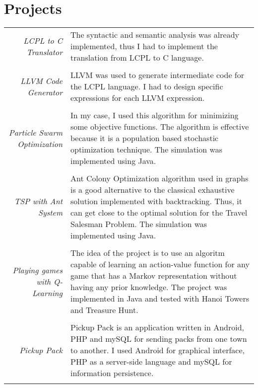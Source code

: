 \documentclass[a4paper,10pt]{article} %
\begin{document}
\section{Projects}
\begin{tabular}{r|p{11cm}}

\emph{LCPL to C Translator}
& \footnotesize{The syntactic and semantic analysis was already implemented, thus I had to implement the translation from LCPL to C language.}\\
\multicolumn{2}{c}{} \\

\emph{LLVM Code Generator}
& \footnotesize{LLVM was used to generate intermediate code for the LCPL language. I had to design specific expressions for each LLVM expression.}\\
\multicolumn{2}{c}{} \\

\emph{Particle Swarm Optimization}
& \footnotesize{In my case, I used this algorithm for minimizing some objective functions. The algorithm is effective because it is a population based stochastic optimization technique. The simulation was implemented using Java.}\\
\multicolumn{2}{c}{} \\

\emph{TSP with Ant System}
& \footnotesize{Ant Colony Optimization algorithm used in graphs is a good alternative to the classical exhaustive solution implemented with backtracking. Thus, it can get close to the optimal solution for the Travel Salesman Problem. The simulation was implemented using Java.}\\
\multicolumn{2}{c}{} \\

\emph{Playing games with Q-Learning}
& \footnotesize{The idea of the project is to use an algoritm capable of learning an action-value function for any game that has a Markov representation without having any prior knowledge. The project was implemented in Java and tested with Hanoi Towers and Treasure Hunt.}\\
\multicolumn{2}{c}{} \\

\emph{Pickup Pack}
& \footnotesize{Pickup Pack is an application written in Android, PHP and mySQL for sending packs from one town to another. I used Android for graphical interface, PHP as a server-side language and mySQL for information persistence.}\\
\multicolumn{2}{c}{} \\


\end{tabular}
\end{document}
